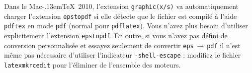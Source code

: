 \documentclass[11pt,french]{article}
\newcommand{\MacTeX}{Mac\kern-.13em\TeX}
\newcommand{\TS}{\textsf{\TeX Shop}}
\newcommand{\To}{\,\(\to\)\,}
\begin{document}
Dans le \MacTeX\ 2010, l'extension \texttt{graphic(x/s)} va automatiquement charger l'extension \texttt{epstopdf} si elle détecte que le fichier est compilé à l'aide \texttt{pdftex} en mode \texttt{pdf} (normal pour \texttt{pdflatex}). Vous n'avez plus besoin d'utiliser explicitement l'extension \texttt{epstopdf}. En outre, si vous n'avez pas défini de conversion personnalisée et essayez seulement de convertir \texttt{eps}\To\texttt{pdf} il n'est même pas nécessaire d'utiliser l'indicateur \texttt{-shell-escape} : modifiez le fichier \texttt{latexmkrcedit} pour l'éliminer de l'ensemble des moteurs.

%
%
%
\end{document}
